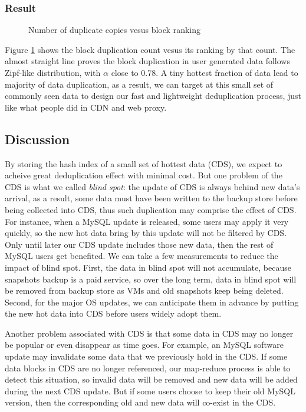 \subsubsection{Result}
\begin{figure}
\centering
{}
\caption{Number of duplicate copies vesus block ranking}
\label{fig:zipf}
\end{figure}

Figure \ref{fig:zipf} shows the block duplication count vesus its ranking by that count. The almost straight line proves 
the block duplication in user generated data follows Zipf-like distribution, with $\alpha$ close to 0.78.
A tiny hottest fraction of data lead to majority of data duplication, as a result, we can target at this small set of commonly seen data
to design our fast and lightweight deduplication process, just like what people did in CDN and web proxy.

\subsection{Discussion}
By storing the hash index of a small set of hottest data (CDS), we expect to acheive great deduplication effect with minimal cost.
But one problem of the CDS is what we called \emph{blind spot}: the update of CDS is always behind new data's arrival,
as a result, some data must have been written to the backup store before being collected into CDS, thus such duplication may comprise the effect of
CDS. For instance, when a MySQL update is released, some users may apply it very quickly, so the new hot data bring by
this update will not be filtered by CDS. Only until later our CDS update includes those new data, then the rest of MySQL users get benefited.
We can take a few measurements to reduce the impact of blind spot. First, the data in blind spot will not accumulate, because snapshots backup
is a paid service, so over the long term, data in blind spot will be removed from backup store as VMs and old snapshots keep being deleted.
Second, for the major OS updates, we can anticipate them in advance by putting the new hot data into CDS before users widely adopt them.

Another problem associated with CDS is that some data in CDS may no longer be popular or even disappear
as time goes. For example, an MySQL software update may invalidate some data that we previously hold in 
the CDS. If some data blocks in CDS are no longer referenced, our map-reduce process is able to detect
this situation, so invalid data will be removed and new data will be added during the next CDS update. 
But if some users choose to keep their old MySQL version, then the corresponding old and new data will co-exist in the CDS.

